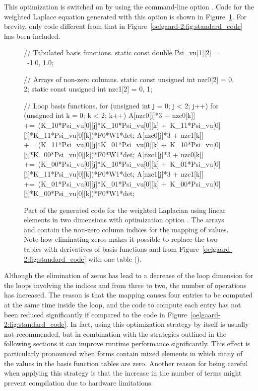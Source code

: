 This optimization is switched on by using the command-line
option . Code for the weighted
Laplace equation generated with this option is shown in
Figure~\ref{oelgaard-2:fig:O_zeros_code}. For brevity, only code different
from that in Figure~\ref{oelgaard-2:fig:standard_code} has been included.
%
\begin{figure}
\begin{c++}
// Tabulated basis functions.
static const double Psi_vu[1][2] = \
{{-1.0, 1.0}};

// Arrays of non-zero columns.
static const unsigned int nzc0[2] = {0, 2};
static const unsigned int nzc1[2] = {0, 1};

// Loop basis functions.
for (unsigned int j = 0; j < 2; j++)
{
 for (unsigned int k = 0; k < 2; k++)
 {
  A[nzc0[j]*3 + nzc0[k]] +=\
   (K_10*Psi_vu[0][j]*K_10*Psi_vu[0][k] +\
    K_11*Psi_vu[0][j]*K_11*Psi_vu[0][k])*F0*W1*det;
  A[nzc0[j]*3 + nzc1[k]] +=\
   (K_11*Psi_vu[0][j]*K_01*Psi_vu[0][k] +\
    K_10*Psi_vu[0][j]*K_00*Psi_vu[0][k])*F0*W1*det;
  A[nzc1[j]*3 + nzc0[k]] +=\
   (K_00*Psi_vu[0][j]*K_10*Psi_vu[0][k] +\
    K_01*Psi_vu[0][j]*K_11*Psi_vu[0][k])*F0*W1*det;
  A[nzc1[j]*3 + nzc1[k]] +=\
   (K_01*Psi_vu[0][j]*K_01*Psi_vu[0][k] +\
    K_00*Psi_vu[0][j]*K_00*Psi_vu[0][k])*F0*W1*det;
 }
}
\end{c++}
\caption{Part of the generated code for the weighted Laplacian using
         linear elements in two dimensions with optimization option
         \emp{-f eliminate\_zeros}.  The arrays  and 
         contain the non-zero column indices for the mapping of values.
         Note how eliminating zeros makes it possible to replace the two
         tables with derivatives of basis functions  and
          from Figure~\ref{oelgaard-2:fig:standard_code}
         with one table ().}
\label{oelgaard-2:fig:O_zeros_code}
\end{figure}
%
Although the elimination of zeros has lead to a decrease of the
loop dimension for the loops involving the indices \emp{j} and
\emp{k} from three to two, the number of operations has increased.
The reason is that the mapping causes four entries to be computed
at the same time inside the loop, and the code to compute each
entry has not been reduced significantly if compared to the code
in Figure~\ref{oelgaard-2:fig:standard_code}.  In fact, using this
optimization strategy by itself is usually not recommended, but in
combination with the strategies outlined in the following sections it can
improve runtime performance significantly.  This effect is particularly
pronounced when forms contain mixed elements in which many of the values
in the basis function tables are zero.  Another reason for being careful
when applying this strategy is that the increase in the number of terms
might prevent \ffc{} compilation due to hardware limitations.
